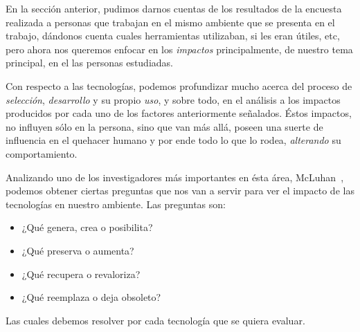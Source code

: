 
En la sección anterior, pudimos darnos cuentas de los resultados de la encuesta realizada a personas que trabajan
en el mismo ambiente que se presenta en el trabajo, dándonos cuenta cuales herramientas utilizaban, si les eran útiles, etc,
pero ahora nos queremos enfocar en los \emph{impactos} principalmente, de nuestro tema principal, en el las personas estudiadas.

Con respecto a las tecnologías, podemos profundizar mucho acerca del proceso de \emph{selección}, \emph{desarrollo} y su propio \emph{uso},
y sobre todo, en el análisis a los impactos producidos por cada uno de los factores anteriormente señalados.
Éstos impactos, no influyen sólo en la persona, sino que van más allá, poseen una suerte de influencia en el quehacer humano y por ende
todo lo que lo rodea, \emph{alterando} su comportamiento.

Analizando uno de los investigadores más importantes en ésta área, McLuhan~\cite{mcluhan}, podemos obtener ciertas preguntas que nos van a servir para ver el impacto
de las tecnologías en nuestro ambiente.
Las preguntas son:
\begin{itemize}
	\item ¿Qué genera, crea o posibilita?
	\item ¿Qué preserva o aumenta?
 	\item ¿Qué recupera o revaloriza?
	\item ¿Qué reemplaza o deja obsoleto?
\end{itemize}

Las cuales debemos resolver por cada tecnología que se quiera evaluar.

